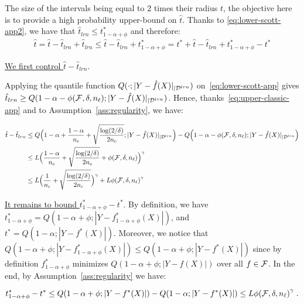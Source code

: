     The size of the intervals being equal to $2$ times their radius $t$, the objective here is to provide a high probability upper-bound on $\hat{t}$. Thanks to \eqref{eq:lower-scott-app2}, we have that $\hat{t}_{lrn} \leq t_{1-\alpha+\phi}^*$ and therefore:
    \begin{align*}
        \hat{t} = \hat{t} - \hat{t}_{lrn} + \hat{t}_{lrn} \leq \hat{t} - \hat{t}_{lrn} + t_{1-\alpha+\phi}^* =  t^* + \hat{t} - \hat{t}_{lrn} + t_{1-\alpha+\phi}^* - t^*
    \end{align*}

    \underline{We first control $\hat{t} - \hat{t}_{lrn}$}.

    
    Applying the quantile function $Q(\cdot; |Y-\hat{f}(X)|_{|{\cal D}^{lrn}})$ on~\eqref{eq:lower-scott-app} gives $\hat{t}_{lrn}\geq Q(1-\alpha - {\phi(\mathcal{F},\delta,n_\ell)}; |Y-\hat{f}(X)|_{|{\cal D}^{lrn}})$. Hence, thanks~\eqref{eq:upper-classic-app} and to Assumption~\ref{ass:regularity}, we have: %

    \begin{align*}
        \hat{t} - \hat{t}_{lrn} &\leq Q\Big(1-\alpha + \frac{1-\alpha}{n_c} + \sqrt{\frac{\log(2/\delta)}{2n_c}}; |Y-\hat{f}(X)|_{|{\cal D}^{lrn}}\Big) - Q\Big(1-\alpha - {\phi(\mathcal{F},\delta,n_\ell)}; |Y-\hat{f}(X)|_{|{\cal D}^{lrn}}\Big) \\
        & \leq L\Big(\frac{1-\alpha}{n_c} + \sqrt{\frac{\log(2/\delta)}{2n_c}} + {\phi(\mathcal{F},\delta,n_\ell)}\Big)^\gamma\\
        &\leq L\Big(\frac{1}{n_c}+\sqrt{\frac{\log(2/\delta)}{2n_c}}\Big)^{\gamma} + L{\phi(\mathcal{F},\delta,n_\ell)}^\gamma
    \end{align*}
    
    \underline{It remains to bound $t_{1-\alpha+\phi}^* - t^*$}. By definition, we have $t_{1-\alpha+\phi}^* = Q(1-\alpha + \phi; |Y-f_{1-\alpha+\phi}^*(X)|)$, and $t^* = Q(1-\alpha; |Y-f^*(X)|)$. Moreover, we notice that $Q(1-\alpha + \phi; |Y-f_{1-\alpha+\phi}^*(X)|) \leq Q(1-\alpha + \phi; |Y-f^*(X)|)$ since by definition $f_{1-\alpha+\phi}^*$ minimizes $Q(1-\alpha + \phi; |Y-f(X)|)$ over all $f\in\mathcal{F}$.
     In the end, by Assumption~\ref{ass:regularity} we have:
     
     \begin{equation*}
        t_{1-\alpha+\phi}^* - t^* \leq Q(1-\alpha + \phi; |Y-f^*(X)|) - Q(1-\alpha; |Y-f^*(X)|) \leq L{\phi(\mathcal{F},\delta,n_\ell)}^\gamma\;.
     \end{equation*}

